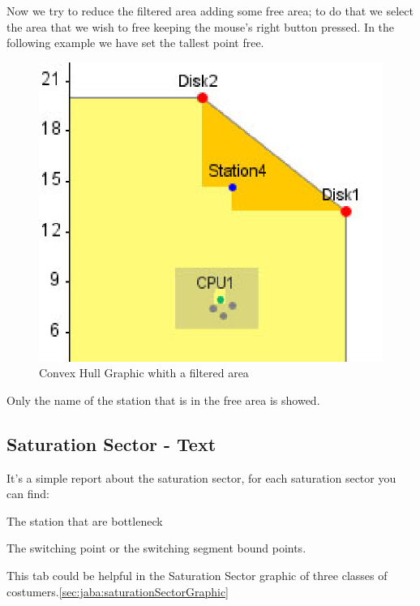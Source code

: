 Now we try to reduce the filtered area adding some free area; to do that we select the area that we wish to free keeping the mouse's right button pressed. In the following example we have set the tallest point free.
\begin{figure}[htbp]
    \begin{center}
        \includegraphics[scale=.5]{img/jaba/convexHullFree}
    \end{center}
    \caption{Convex Hull Graphic whith a filtered area}
    \label{fig:jaba:convexHullaFree}
\end{figure}

Only the name of the station that is in the free area is showed.


\subsection{Saturation Sector - Text}
\label{sec:jaba:saturationSectorText}
It's a simple report about the saturation sector, for each saturation sector you can find:
\begin{itemize*}
\item The station that are bottleneck
\item The switching point or the switching segment bound points.
\end{itemize*}
This tab could be helpful in the Saturation Sector graphic of three classes of costumers.\autoref{sec:jaba:saturationSectorGraphic}



